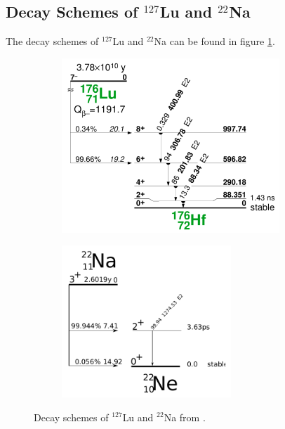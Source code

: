 \subsection{Decay Schemes of $^{127}$Lu and $^{22}$Na}
The decay schemes of $^{127}$Lu and $^{22}$Na can be found in figure \ref{fig:scheme}. 
\begin{figure}[h]
  \centering
  \begin{subfigure}[h]{0.5\textwidth}
    \centering
    \includegraphics[width=0.9\textwidth]{Figures/LuScheme.png}
  \end{subfigure}%
  \begin{subfigure}[h]{0.5\textwidth}
    \centering
    \includegraphics[width=0.7\textwidth]{Figures/NaScheme.png}
  \end{subfigure}
  \caption{Decay schemes of $^{127}$Lu and $^{22}$Na from \cite{further_instructions}.}
  \label{fig:scheme}
\end{figure}   

\newpage
